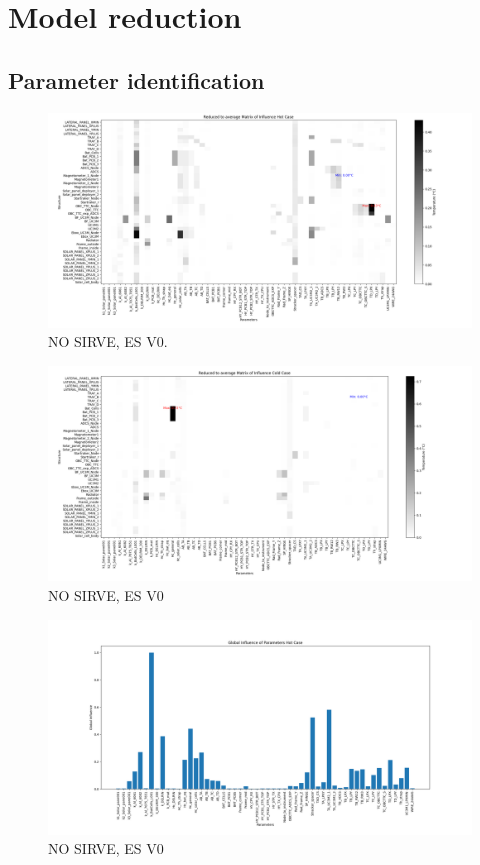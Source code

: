 \section{Model reduction}
\subsection{Parameter identification}
\begin{figure}[H]
	\centering
	\includegraphics[width=\textwidth]{Figures/figs_malas/infmatHot_redAverage.png}
	\caption{NO SIRVE, ES V0.}
	\label{fig:fm1}
\end{figure}
\begin{figure}[H]
	\centering
	\includegraphics[width=\textwidth]{Figures/figs_malas/infmatCold_redAverage.png}
	\caption{NO SIRVE, ES V0}
	\label{fig:fm2}
\end{figure}
\begin{figure}[H]
	\centering
	\includegraphics[width=\textwidth]{Figures/figs_malas/infGlobalHot.png}
	\caption{NO SIRVE, ES V0}
	\label{fig:fm3}
\end{figure}
